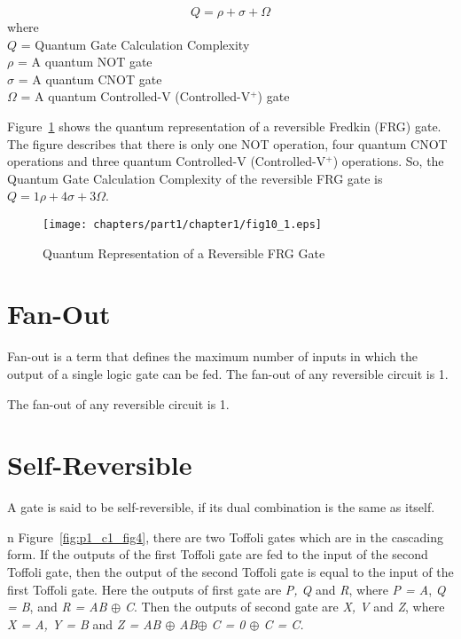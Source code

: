 \begin{equation}
Q=\rho+\sigma+\Omega
\end{equation}
\noindent where\\
$Q$ = Quantum Gate Calculation Complexity\\
$\rho$ = A quantum NOT gate \\
$\sigma$ = A quantum CNOT gate   \\
$\Omega$ = A quantum Controlled-V (Controlled-V$^+$) gate


\begin{example}\textnormal{
Figure~\ref{fig:p1_c1_fig10_1} shows the quantum representation of  a  reversible Fredkin (FRG) gate. The figure describes that there is only one NOT operation, four  quantum CNOT operations and three  quantum Controlled-V (Controlled-V$^+$) operations. So, the  Quantum Gate Calculation Complexity of the reversible FRG gate is $Q =1\rho +4\sigma + 3\Omega$.}
\end{example}


\begin{figure}[H]
	\centering
	\texttt{[image: chapters/part1/chapter1/fig10\_1.eps]}
	\caption{Quantum  Representation  of  a  Reversible FRG Gate}
	\label{fig:p1_c1_fig10_1}
\end{figure}



\section{Fan-Out}
Fan-out is a term that defines the maximum number of inputs in which the output of a single logic gate can be fed. The fan-out of any reversible circuit is 1.
\begin{example}\textnormal{
	The fan-out of any reversible circuit is 1.}
\end{example}


\section{Self-Reversible}
A gate is said to be self-reversible, if its dual combination is the same as itself.

\begin{example}\textnormal{
	n Figure~\ref{fig:p1_c1_fig4}, there are two Toffoli gates which are in the cascading form. If the outputs of the first Toffoli gate are fed to the input of the second Toffoli gate, then the output of the second Toffoli gate is equal to the input of the first Toffoli gate.
Here the outputs of first gate are \textit{P, Q} and \textit{R}, where \textit{P = A}, \textit{Q = B}, and \textit{R = AB} $\oplus$ \textit{C}. Then the outputs of second gate are \textit{X, V} and \textit{Z}, where \textit{X = A, Y = B} and \textit{Z = AB $\oplus$ AB$\oplus$ C = 0 $\oplus$ C = C.}}
\end{example}



